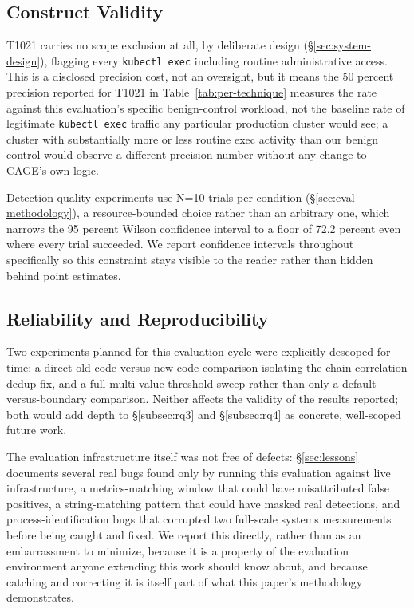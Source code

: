 \documentclass{ieeeaccess}
\begin{document}
\subsection{Construct Validity}
\label{subsec:construct-validity}

T1021 carries no scope exclusion at all, by deliberate design
(\S\ref{sec:system-design}), flagging every \texttt{kubectl exec} including
routine administrative access. This is a disclosed precision cost, not
an oversight, but it means the 50 percent precision reported for T1021
in Table~\ref{tab:per-technique} measures the rate against this
evaluation's specific benign-control workload, not the baseline rate
of legitimate \texttt{kubectl exec} traffic any particular production
cluster would see; a cluster with substantially more or less routine
exec activity than our benign control would observe a different
precision number without any change to CAGE's own logic.

Detection-quality experiments use N=10 trials per condition
(\S\ref{sec:eval-methodology}), a resource-bounded choice rather than
an arbitrary one, which narrows the 95 percent Wilson confidence
interval to a floor of 72.2 percent even where every trial succeeded.
We report confidence intervals throughout specifically so this
constraint stays visible to the reader rather than hidden behind point
estimates.

\subsection{Reliability and Reproducibility}
\label{subsec:reliability}

Two experiments planned for this evaluation cycle were explicitly
descoped for time: a direct old-code-versus-new-code comparison
isolating the chain-correlation dedup fix, and a full multi-value
threshold sweep rather than only a default-versus-boundary comparison.
Neither affects the validity of the results reported; both would add
depth to \S\ref{subsec:rq3} and \S\ref{subsec:rq4} as concrete,
well-scoped future work.

The evaluation infrastructure itself was not free of defects:
\S\ref{sec:lessons} documents several real bugs found only by running
this evaluation against live infrastructure, a metrics-matching window
that could have misattributed false positives, a string-matching
pattern that could have masked real detections, and
process-identification bugs that corrupted two full-scale systems
measurements before being caught and fixed. We report this directly,
rather than as an embarrassment to minimize, because it is a property
of the evaluation environment anyone extending this work should know
about, and because catching and correcting it is itself part of what
this paper's methodology demonstrates.
\end{document}
